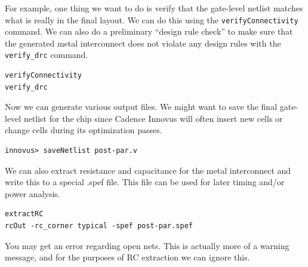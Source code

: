 \documentclass[a4paper,12pt,twoside]{article}
\begin{document}
For example, one thing we want to do is verify that the gate-level netlist matches what is really in the final layout. We can do this using the \texttt{verifyConnectivity} command. We can also do a preliminary “design rule check” to make sure that the generated metal interconnect does not violate any design rules with the \texttt{verify\_drc} command.
\begin{verbatim}
verifyConnectivity
verify_drc
\end{verbatim}
Now we can generate various output files. We might want to save the final gate-level netlist for the chip since Cadence Innovus will often insert new cells or change cells during its optimization passes.
\begin{verbatim}
innovus> saveNetlist post-par.v
\end{verbatim}
We can also extract resistance and capacitance for the metal interconnect and write this to a special .spef file. This file can be used for later timing and/or power analysis.
\begin{verbatim}
extractRC
rcOut -rc_corner typical -spef post-par.spef
\end{verbatim}
You may get an error regarding open nets. This is actually more of a warning message, and for the purposes of RC extraction we can ignore this.
\end{document}
